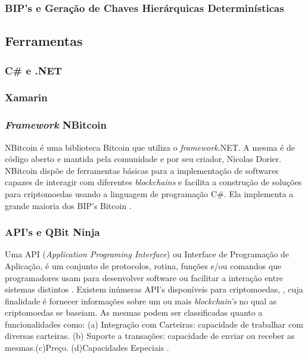 \documentclass[
	article,			%
	11pt,				%
	oneside,			%
	a4paper,			%
	chapter=TITLE,		%
	section=TITLE,		%
	subsection=TITLE,	%
	subsubsection=TITLE, %
	english,			%
	brazil,				%
	sumario=tradicional
	]{ifrs-artigo-abntex2}
\begin{document}
\subsubsection{BIP's e Geração de Chaves Hierárquicas Determinísticas}

\subsection{Ferramentas}
\subsubsection{C{\#} e .NET}


\subsubsection{Xamarin}


\subsubsection{\textit{Framework} NBitcoin}
NBitcoin é uma biblioteca Bitcoin que utiliza o \textit{framework}.NET. A mesma é de código aberto e mantida pela comunidade e por seu criador, Nicolas Dorier. NBitcoin dispõe de ferramentas básicas para a implementação de softwares capazes de interagir com diferentes \textit{blockchains} e facilita a construção de soluções para criptomoedas usando a linguagem de programação C{\#}. Ela implementa a grande maioria dos BIP’s Bitcoin \cite{heHenry2018}.

\subsubsection{API's e QBit Ninja}
Uma API (\textit{Application Programing Interface}) ou Interface de Programação de Aplicação, é um conjunto de protocolos, rotina, funções e/ou comandos que programadores usam para desenvolver software ou facilitar a interação entre sistemas distintos \cite{techoAPI2018}. Existem inúmeras API’s disponíveis para criptomoedas, , cuja finalidade é fornecer informações sobre um ou mais \textit{blockchain’s} no qual as criptomoedas se baseiam. As mesmas podem ser classificadas quanto a  funcionalidades como: (a) Integração com Carteiras: capacidade de trabalhar com diversas carteiras. (b) Suporte a transações: capacidade de enviar ou receber as mesmas.(c)Preço. (d)Capacidades Especiais \cite{lastcAPIS}.
\end{document}
